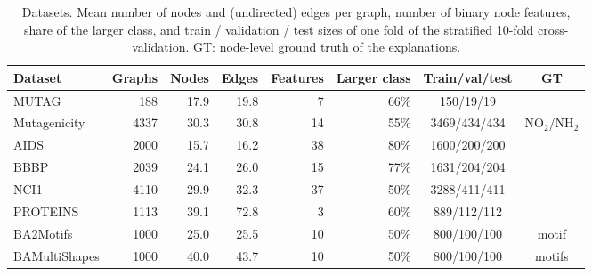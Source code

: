 %
\begin{table}[t]
  \centering
  \caption{Datasets. Mean number of nodes and (undirected) edges per graph, number of
    binary node features, share of the larger class, and train / validation / test sizes
    of one fold of the stratified 10-fold cross-validation. GT: node-level ground truth
    of the explanations.}
  \label{tab:datasets}
  \small
  \begin{tabular}{lrrrrrcc}
    \toprule
    Dataset & Graphs & Nodes & Edges & Features & Larger class & Train/val/test & GT \\
    \midrule
    MUTAG         &  188 & 17.9 & 19.8 &  7 & 66\% & 150/19/19    &            \\
    Mutagenicity  & 4337 & 30.3 & 30.8 & 14 & 55\% & 3469/434/434 & NO$_2$/NH$_2$ \\
    AIDS          & 2000 & 15.7 & 16.2 & 38 & 80\% & 1600/200/200 &            \\
    BBBP          & 2039 & 24.1 & 26.0 & 15 & 77\% & 1631/204/204 &            \\
    NCI1          & 4110 & 29.9 & 32.3 & 37 & 50\% & 3288/411/411 &            \\
    PROTEINS      & 1113 & 39.1 & 72.8 &  3 & 60\% & 889/112/112  &            \\
    BA2Motifs     & 1000 & 25.0 & 25.5 & 10 & 50\% & 800/100/100  & motif      \\
    BAMultiShapes & 1000 & 40.0 & 43.7 & 10 & 50\% & 800/100/100  & motifs     \\
    \bottomrule
  \end{tabular}
\end{table}
